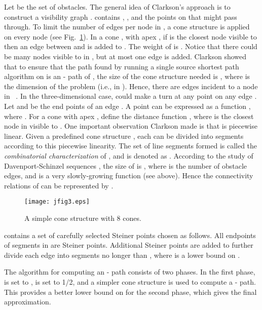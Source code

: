 \documentclass{llncs}
\begin{document}
Let  be the set of obstacles.
The general idea of Clarkson's approach is to construct a visibility graph .
 contains , , and the points on  that  might pass through. To limit the number of
edges per node in , a cone structure  is applied on every node 
(see Fig.~\ref{jfig3}). In a cone ,
with apex , if  is the closest node visible to  then an edge  between  and  is added to
. The weight of  is . Notice that there could be many nodes visible to  in , but at
most one edge is added. Clarkson showed that to ensure that the path found by running a single
source shortest path algorithm on  is an - path of ,
the size of the cone structure needed is , where  is the dimension of the problem
(i.e.,  in ).
Hence, there are  edges incident to a node in ~\cite{Clar87}.
In the three-dimensional case,  could make a turn at any point on any edge .
Let  and  be the end points of an edge . A point  can be expressed as a function
, where .
For a cone  with apex ,
define the distance function , where
 is the closest node in  visible to .
One important observation Clarkson made is that  is piecewise linear.
Given a predefined cone structure , each  can be divided into segments according to
this piecewise
linearity. The set of line segments formed is called the \emph{combinatorial characterization} of
 \cite{Clar87}, and is denoted as . According to the study of Davenport-Schinzel
sequences \cite{SCK86}, the size of  is , where  is the
number of obstacle edges, and  is a very slowly-growing function (see above).
Hence the connectivity relations of  can be represented by .

\begin{figure}\begin{center}
    \leavevmode
\texttt{[image: jfig3.eps]}
    \caption{A simple cone structure with 8 cones.}
    \label{jfig3}
    \end{center}
\end{figure}

 contains a set of
carefully selected Steiner points chosen as follows.
All endpoints of segments in  are Steiner
points. Additional Steiner points are added to further divide each edge into segments no longer than
, where  is a lower bound on .

The algorithm for computing an - path consists of two phases.
In the first phase,  is set to
,  is set to 1/2, and a simpler cone structure is used
to compute a - path. This provides a better lower bound on  for the second phase,
which gives the final approximation.
\end{document}
